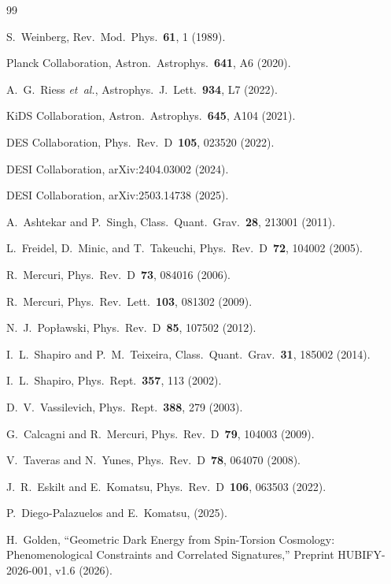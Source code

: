 \documentclass[aps,prd,twocolumn,superscriptaddress,showpacs,preprintnumbers,
  nofootinbib,longbibliography,floatfix]{revtex4-2}
\newcommand{\etal}{\textit{et~al.}}
\begin{document}
\begin{thebibliography}{99}

S.~Weinberg,
Rev.\ Mod.\ Phys.\ \textbf{61}, 1 (1989).

Planck Collaboration,
Astron.\ Astrophys.\ \textbf{641}, A6 (2020).

A.~G.~Riess \etal,
Astrophys.\ J.\ Lett.\ \textbf{934}, L7 (2022).

KiDS Collaboration,
Astron.\ Astrophys.\ \textbf{645}, A104 (2021).

DES Collaboration,
Phys.\ Rev.\ D~\textbf{105}, 023520 (2022).

DESI Collaboration,
arXiv:2404.03002 (2024).

DESI Collaboration,
arXiv:2503.14738 (2025).

A.~Ashtekar and P.~Singh,
Class.\ Quant.\ Grav.\ \textbf{28}, 213001 (2011).

L.~Freidel, D.~Minic, and T.~Takeuchi,
Phys.\ Rev.\ D~\textbf{72}, 104002 (2005).

R.~Mercuri,
Phys.\ Rev.\ D~\textbf{73}, 084016 (2006).

R.~Mercuri,
Phys.\ Rev.\ Lett.\ \textbf{103}, 081302 (2009).

N.~J.~Pop\l{}awski,
Phys.\ Rev.\ D~\textbf{85}, 107502 (2012).

I.~L.~Shapiro and P.~M.~Teixeira,
Class.\ Quant.\ Grav.\ \textbf{31}, 185002 (2014).

I.~L.~Shapiro,
Phys.\ Rept.\ \textbf{357}, 113 (2002).

D.~V.~Vassilevich,
Phys.\ Rept.\ \textbf{388}, 279 (2003).

G.~Calcagni and R.~Mercuri,
Phys.\ Rev.\ D~\textbf{79}, 104003 (2009).

V.~Taveras and N.~Yunes,
Phys.\ Rev.\ D~\textbf{78}, 064070 (2008).

J.~R.~Eskilt and E.~Komatsu,
Phys.\ Rev.\ D~\textbf{106}, 063503 (2022).

P.~Diego-Palazuelos and E.~Komatsu,
(2025).

H.~Golden,
``Geometric Dark Energy from Spin-Torsion Cosmology:
Phenomenological Constraints and Correlated Signatures,''
Preprint HUBIFY-2026-001, v1.6 (2026).


\end{thebibliography}
\end{document}
